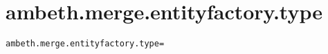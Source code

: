 \section{ambeth.merge.entityfactory.type}
\label{configuration:AmbethMergeEntityfactoryType}
\AvailableInJavaAndCsharp{\TODO}
\begin{lstlisting}[style=Props,caption={Usage example for \textit{ambeth.merge.entityfactory.type}}]
ambeth.merge.entityfactory.type=
\end{lstlisting}